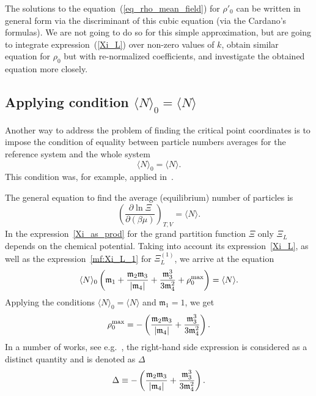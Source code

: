 The solutions to the equation~(\ref{eq_rho_mean_field}) for $\rho'_0$ can be written in general form via the discriminant of this cubic equation (via the Cardano's formulas). We are not going to do so for this simple approximation, but are going to integrate expression~(\ref{Xi_L}) over non-zero values of $k$, obtain similar equation for $\rho_0$ but with re-normalized coefficients, and investigate the obtained equation more closely.

\subsection{Applying condition $\langle N \rangle_0 = \langle N \rangle$}
Another way to address the problem of finding the critical point coordinates is to impose the condition of equality between particle numbers averages for the reference system and the whole system
\begin{equation}
	\langle N \rangle_0 = \langle N \rangle.
\end{equation}
This condition was, for example, applied in~\cite{YukhJSP1995}.

The general equation to find the average (equilibrium) number of particles is
\begin{equation}
	\left(\frac{\partial \ln\Xi}{\partial (\beta\mu)}\right)_{T,V} = \langle N \rangle.
\end{equation}
In the expression~\ref{Xi_as_prod} for the grand partition function $\Xi$ only $\Xi_L$ depends on the chemical potential. Taking into account its expression~\ref{Xi_L}, as well as the expression~\ref{mf:Xi_L_1} for $\Xi_L^{(1)}$, we arrive at the equation
\begin{equation}
	\langle N \rangle_0
	\left(
	\mathfrak{m}_1 + \frac{\mathfrak{m}_2 \mathfrak{m}_3}{\abs{\mathfrak{m}_4}} + \frac{\mathfrak{m}_3^3}{3\mathfrak{m}_4^2}  + \rho_0^{\rm{max}}
	\right) 
	= \langle N \rangle.
\end{equation}
Applying the conditions $\langle N \rangle_0 = \langle N \rangle$ and $\mathfrak{m}_1 = 1$, we get
\begin{equation}
	\rho_0^{\rm{max}} = - \left(\frac{\mathfrak{m}_2 \mathfrak{m}_3}{\abs{\mathfrak{m}_4}} + \frac{\mathfrak{m}_3^3}{3\mathfrak{m}_4^2}\right).
\end{equation}
In a number of works, see e.g.~\cite{YukhJSP1995,Yukh2013,Yukh2014}, the right-hand side expression is considered as a distinct quantity and is denoted as $\Delta$
\begin{equation}
	\label{def:Delta}
	\Delta \equiv - \left(\frac{\mathfrak{m}_2 \mathfrak{m}_3}{\abs{\mathfrak{m}_4}} + \frac{\mathfrak{m}_3^3}{3\mathfrak{m}_4^2}\right).
\end{equation}

